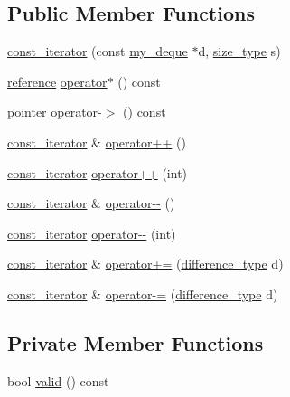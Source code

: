 \subsection*{Public Member Functions}
\begin{DoxyCompactItemize}
\item 
\hyperlink{classmy__deque_1_1const__iterator_a0a2f93bb4201408df6cc031a75b01363}{const\-\_\-iterator} (const \hyperlink{classmy__deque}{my\-\_\-deque} $\ast$d, \hyperlink{classmy__deque_a61e5e5317fe72a381ce4d45f09544b02}{size\-\_\-type} s)
\item 
\hyperlink{classmy__deque_1_1const__iterator_a37cd7eef8e73e5a65d7a9d16ba6d3ed2}{reference} \hyperlink{classmy__deque_1_1const__iterator_a14715989004b54dc6a1bcd3d2ac78a20}{operator$\ast$} () const 
\item 
\hyperlink{classmy__deque_1_1const__iterator_a6a7d42610f3b7e55f38897c151862071}{pointer} \hyperlink{classmy__deque_1_1const__iterator_aef7e08cfcebb0c0932422f420645e1ce}{operator-\/$>$} () const 
\item 
\hyperlink{classmy__deque_1_1const__iterator}{const\-\_\-iterator} \& \hyperlink{classmy__deque_1_1const__iterator_a8bc45a394bb73728fca1ebf90755d662}{operator++} ()
\item 
\hyperlink{classmy__deque_1_1const__iterator}{const\-\_\-iterator} \hyperlink{classmy__deque_1_1const__iterator_adf9ea902391ac993088e7c969c64e4de}{operator++} (int)
\item 
\hyperlink{classmy__deque_1_1const__iterator}{const\-\_\-iterator} \& \hyperlink{classmy__deque_1_1const__iterator_ae5dffda4ac0a8ad59a4954dcdeeb5f98}{operator-\/-\/} ()
\item 
\hyperlink{classmy__deque_1_1const__iterator}{const\-\_\-iterator} \hyperlink{classmy__deque_1_1const__iterator_a83c405a1e0b9672c074aaa933a7127df}{operator-\/-\/} (int)
\item 
\hyperlink{classmy__deque_1_1const__iterator}{const\-\_\-iterator} \& \hyperlink{classmy__deque_1_1const__iterator_a2bbc121cc446855edcb9d20451cae024}{operator+=} (\hyperlink{classmy__deque_1_1const__iterator_abe3b655aa980c8a12ba486058464c91d}{difference\-\_\-type} d)
\item 
\hyperlink{classmy__deque_1_1const__iterator}{const\-\_\-iterator} \& \hyperlink{classmy__deque_1_1const__iterator_ab51576a76fd33fd55be87ca4c467dc96}{operator-\/=} (\hyperlink{classmy__deque_1_1const__iterator_abe3b655aa980c8a12ba486058464c91d}{difference\-\_\-type} d)
\end{DoxyCompactItemize}
\subsection*{Private Member Functions}
\begin{DoxyCompactItemize}
\item 
bool \hyperlink{classmy__deque_1_1const__iterator_ab233485f07a0be8dbc1b41987cc1af42}{valid} () const 
\end{DoxyCompactItemize}
